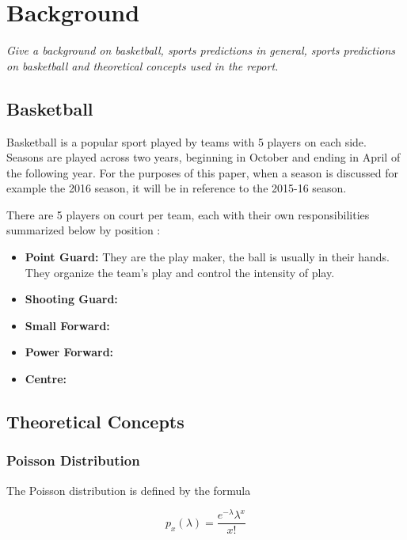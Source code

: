\chapter{Background}

\textit{Give a background on basketball, sports predictions in general, sports predictions on basketball and theoretical concepts used in the report.}

\section{Basketball}
Basketball is a popular sport played by teams with 5 players on each side.  Seasons are played across two years, beginning in October and ending in April of the following year.  For the purposes of this paper, when a season is discussed for example the 2016 season, it will be in reference to the 2015-16 season.

There are 5 players on court per team, each with their own responsibilities summarized below by position \cite{player_criteria}:

\begin{itemize}
	\item \textbf{Point Guard:} They are the play maker, the ball is usually in their hands.  They organize the team's play and control the intensity of play.
	\item \textbf{Shooting Guard:}
	\item \textbf{Small Forward:}
	\item \textbf{Power Forward:}
	\item \textbf{Centre:}
\end{itemize}

\section{Theoretical Concepts}

\subsection{Poisson Distribution}
The Poisson distribution is defined by the formula \cite{poisson}

\begin{equation}
p_x(\lambda) = \frac{e^{-\lambda}\lambda^x}{x!}
\end{equation}